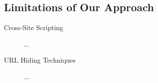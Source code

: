 \subsection{Limitations of Our Approach}
\begin{description}
	\item[Cross-Site Scripting] ...
	\item[URL Hiding Techniques] ...
\end{description}

